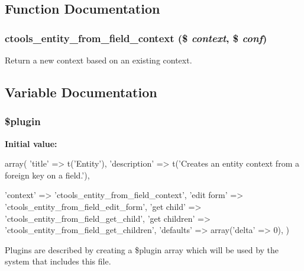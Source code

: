 \subsection{Function Documentation}
\hypertarget{entity__from__field_8inc_a90eee9e4a648484dfc3de0d3f79cdfa8}{
\subsubsection[{ctools\_\-entity\_\-from\_\-field\_\-context}]{\setlength{\rightskip}{0pt plus 5cm}ctools\_\-entity\_\-from\_\-field\_\-context (\$ {\em context}, \/  \$ {\em conf})}}
\label{entity__from__field_8inc_a90eee9e4a648484dfc3de0d3f79cdfa8}
Return a new context based on an existing context. 

\subsection{Variable Documentation}
\hypertarget{entity__from__field_8inc_ada8a7130088351710bb02ed622d6bf65}{
\subsubsection[{\$plugin}]{\setlength{\rightskip}{0pt plus 5cm}\$plugin}}
\label{entity__from__field_8inc_ada8a7130088351710bb02ed622d6bf65}
{\bfseries Initial value:}
\begin{DoxyCode}
 array(
  'title' => t('Entity'),
  'description' => t('Creates an entity context from a foreign key on a field.'),
      
  'context' => 'ctools_entity_from_field_context',
  'edit form' => 'ctools_entity_from_field_edit_form',
  'get child' => 'ctools_entity_from_field_get_child',
  'get children' => 'ctools_entity_from_field_get_children',
  'defaults' => array('delta' => 0),
)
\end{DoxyCode}
Plugins are described by creating a \$plugin array which will be used by the system that includes this file. 